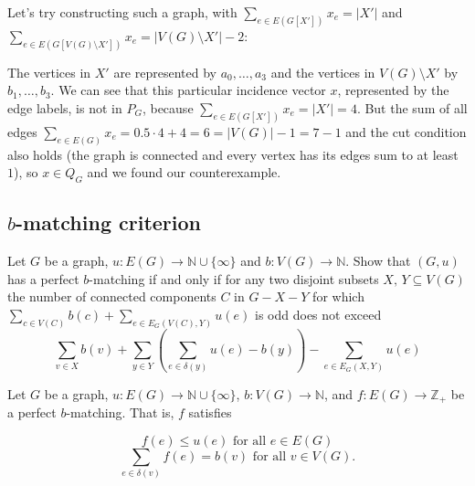 \documentclass{article}
\newcommand{\N}{\mathbb{N}}
\begin{document}
  Let's try constructing such a graph, with $\sum_{e\in E(G[X'])} x_{e} = |X'|$ and $\sum_{e\in E(G[V(G) \setminus X'])} x_{e} = |V(G) \setminus X'| - 2$:
  \begin{center}
  \end{center}
  The vertices in $X'$ are represented by $a_0,\dots,a_3$ and the vertices in $V(G) \setminus X'$ by $b_1,\dots,b_3$.
  We can see that this particular incidence vector $x$, represented by the edge labels, is not in $P_G$,
  because $\sum_{e\in E(G[X'])} x_{e} = |X'| = 4$.
  But the sum of all edges $ \sum_{e\in E(G)} x_{e} = 0.5 \cdot 4 + 4 = 6 = |V(G)|-1 = 7-1$
  and the cut condition also holds (the graph is connected and every vertex has its edges sum to at least $1$),
  so $x \in Q_G$ and we found our counterexample.

  \subsection{$b$-matching criterion}
  \begin{centerframebox}
    Let $G$ be a graph, $u: E(G) \to \N \cup \{\infty\}$ and $b : V (G) \to \N$.
    Show that $(G, u)$ has a perfect $b$-matching if and only if for any two disjoint subsets
    $X,\, Y \subseteq V (G)$ the number of connected components $C$ in $G - X - Y$ for which
    $\sum_{c\in V(C)}b(c) + \sum_{e\in E_G(V(C),Y)}u(e)$
    is odd does not exceed
    \[ \sum_{v\in X}b(v)+\sum_{y\in Y}\left(\sum_{e\in\delta(y)}u(e)-b(y)\right)-\sum_{e\in E_{G}(X,Y)}u(e) \]
  \end{centerframebox}
  Let $G$ be a graph, $u: E(G) \to \N \cup \{\infty\}$, $b : V (G) \to \N$, and $f:E(G)\rightarrow \mathbb{Z}_+$ be a perfect $b$-matching. That is, $f$ satisfies

  $$f(e)\leq u(e) \text{ for all }e\in E(G)$$
  $$\sum_{e\in \delta(v)}f(e)=b(v)  \text{ for all }v\in V(G).$$
\end{document}
